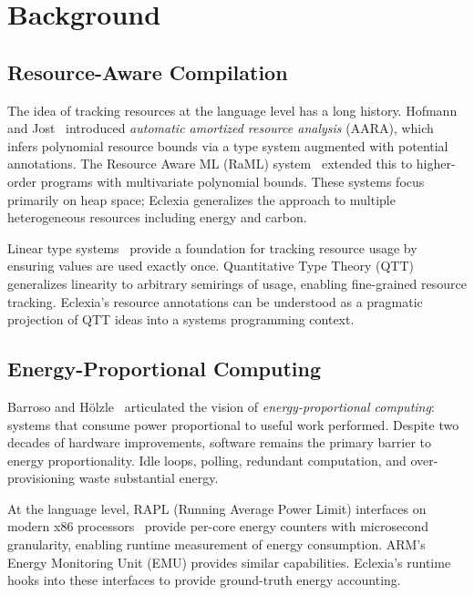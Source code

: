 \documentclass[11pt,a4paper]{article}
\begin{document}
\section{Background}
\label{sec:background}

\subsection{Resource-Aware Compilation}

The idea of tracking resources at the language level has a long history.
Hofmann and Jost~\cite{hofmann2003} introduced \emph{automatic amortized resource
analysis} (AARA), which infers polynomial resource bounds via a type system
augmented with potential annotations.  The Resource Aware ML (RaML)
system~\cite{hoffmann2012} extended this to higher-order programs with
multivariate polynomial bounds.  These systems focus primarily on heap space;
Eclexia generalizes the approach to multiple heterogeneous resources including
energy and carbon.

Linear type systems~\cite{wadler1990,girard1987} provide a foundation for
tracking resource usage by ensuring values are used exactly once.  Quantitative
Type Theory (QTT)~\cite{atkey2018,mcbride2016} generalizes linearity to
arbitrary semirings of usage, enabling fine-grained resource tracking.
Eclexia's resource annotations can be understood as a pragmatic projection of
QTT ideas into a systems programming context.

\subsection{Energy-Proportional Computing}

Barroso and H\"{o}lzle~\cite{barroso2007} articulated the vision of
\emph{energy-proportional computing}: systems that consume power proportional to
useful work performed.  Despite two decades of hardware improvements, software
remains the primary barrier to energy proportionality.  Idle loops, polling,
redundant computation, and over-provisioning waste substantial energy.

At the language level, RAPL (Running Average Power Limit) interfaces on modern
x86 processors~\cite{intel_rapl} provide per-core energy counters with
microsecond granularity, enabling runtime measurement of energy consumption.
ARM's Energy Monitoring Unit (EMU) provides similar capabilities.  Eclexia's
runtime hooks into these interfaces to provide ground-truth energy accounting.
\end{document}
